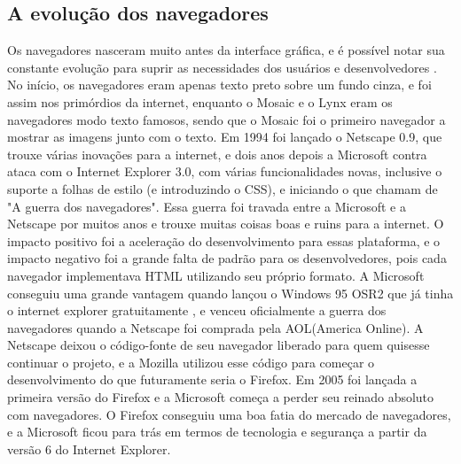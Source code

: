 \subsection{A evolução dos navegadores}

Os navegadores nasceram muito antes da interface gráfica,
e é possível notar sua constante evolução para suprir as necessidades
dos usuários e desenvolvedores \cite{robbins2006web}. No início, os
navegadores eram apenas texto preto sobre um fundo cinza, e foi assim
nos primórdios da internet, enquanto o Mosaic e o Lynx eram os
navegadores modo texto famosos, sendo que o Mosaic foi o primeiro
navegador a mostrar as imagens junto com o texto.
Em 1994 foi lançado o Netscape 0.9, que
trouxe várias inovações para a internet, e dois anos depois a
Microsoft contra ataca com o Internet Explorer 3.0, com várias
funcionalidades novas, inclusive o suporte a folhas de estilo (e
introduzindo o CSS), e iniciando o que chamam de "A guerra dos
navegadores". Essa guerra foi travada entre a Microsoft e a Netscape
por muitos anos e trouxe muitas coisas boas e ruins para a internet. O
impacto positivo foi a aceleração do desenvolvimento para essas
plataforma, e o impacto negativo foi a grande falta de padrão para os
desenvolvedores, pois cada navegador implementava HTML utilizando seu
próprio formato. A Microsoft conseguiu uma grande vantagem quando lançou
o Windows 95 OSR2 que já tinha o internet explorer gratuitamente
\cite{asleson2006foundations}, e venceu oficialmente a guerra dos navegadores quando a
Netscape foi comprada pela AOL(America Online). A Netscape deixou o código-fonte
de seu navegador liberado para quem quisesse continuar o projeto,
e a Mozilla utilizou esse código para começar o desenvolvimento
do que futuramente seria o Firefox.
Em 2005 foi lançada a primeira versão do Firefox e a Microsoft começa
a perder seu reinado absoluto com navegadores. O Firefox conseguiu uma
boa fatia do mercado de navegadores, e a Microsoft ficou para trás em
termos de tecnologia e segurança a partir da versão 6 do Internet Explorer.

